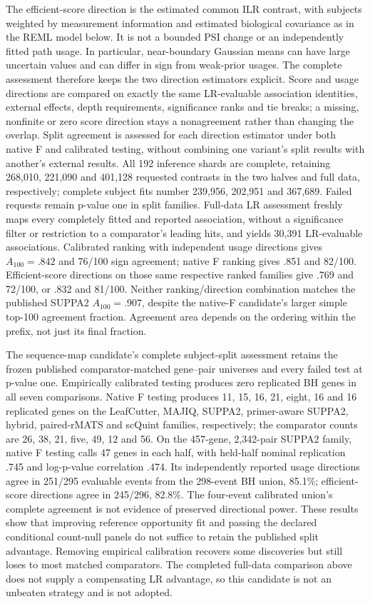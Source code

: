 \documentclass[11pt]{article}
\begin{document}
The efficient-score direction is the estimated common ILR contrast, with subjects weighted by measurement information and estimated biological covariance as in the REML model below. It is not a bounded PSI change or an independently fitted path usage. In particular, near-boundary Gaussian means can have large uncertain values and can differ in sign from weak-prior usages. The complete assessment therefore keeps the two direction estimators explicit. Score and usage directions are compared on exactly the same LR-evaluable association identities, external effects, depth requirements, significance ranks and tie breaks; a missing, nonfinite or zero score direction stays a nonagreement rather than changing the overlap. Split agreement is assessed for each direction estimator under both native F and calibrated testing, without combining one variant's split results with another's external results. All 192 inference shards are complete, retaining 268,010, 221,090 and 401,128 requested contrasts in the two halves and full data, respectively; complete subject fits number 239,956, 202,951 and 367,689. Failed requests remain p-value one in split families. Full-data LR assessment freshly maps every completely fitted and reported association, without a significance filter or restriction to a comparator's leading hits, and yields 30,391 LR-evaluable associations. Calibrated ranking with independent usage directions gives \(A_{100}=.842\) and 76/100 sign agreement; native F ranking gives .851 and 82/100. Efficient-score directions on those same respective ranked families give .769 and 72/100, or .832 and 81/100. Neither ranking/direction combination matches the published SUPPA2 \(A_{100}=.907\), despite the native-F candidate's larger simple top-100 agreement fraction. Agreement area depends on the ordering within the prefix, not just its final fraction.

The sequence-map candidate's complete subject-split assessment retains the frozen published comparator-matched gene--pair universes and every failed test at p-value one. Empirically calibrated testing produces zero replicated BH genes in all seven comparisons. Native F testing produces 11, 15, 16, 21, eight, 16 and 16 replicated genes on the LeafCutter, MAJIQ, SUPPA2, primer-aware SUPPA2, hybrid, paired-rMATS and scQuint families, respectively; the comparator counts are 26, 38, 21, five, 49, 12 and 56. On the 457-gene, 2,342-pair SUPPA2 family, native F testing calls 47 genes in each half, with held-half nominal replication .745 and log-p-value correlation .474. Its independently reported usage directions agree in 251/295 evaluable events from the 298-event BH union, 85.1\%; efficient-score directions agree in 245/296, 82.8\%. The four-event calibrated union's complete agreement is not evidence of preserved directional power. These results show that improving reference opportunity fit and passing the declared conditional count-null panels do not suffice to retain the published split advantage. Removing empirical calibration recovers some discoveries but still loses to most matched comparators. The completed full-data comparison above does not supply a compensating LR advantage, so this candidate is not an unbeaten strategy and is not adopted.
\end{document}
